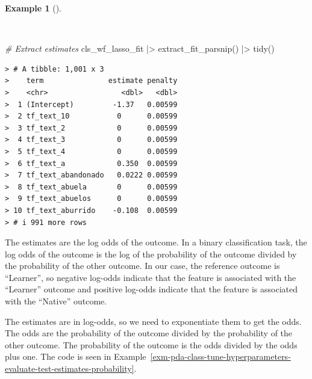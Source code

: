 \documentclass[
  letterpaper,
  DIV=11,
  numbers=noendperiod]{scrreprt}
\newenvironment{Shaded}{\begin{snugshade}}{\end{snugshade}}
\newcommand{\CommentTok}[1]{\textcolor[rgb]{0.00,0.00,0.00}{\textit{#1}}}
\newcommand{\FunctionTok}[1]{\textcolor[rgb]{0.00,0.00,0.00}{#1}}
\newcommand{\NormalTok}[1]{\textcolor[rgb]{0.00,0.00,0.00}{#1}}
\newcommand{\SpecialCharTok}[1]{\textcolor[rgb]{0.00,0.00,0.00}{#1}}
\theoremstyle{definition}
\newtheorem{example}{Example}[chapter]
\theoremstyle{remark}
\begin{document}
\begin{example}[]\protect\hypertarget{exm-pda-class-tune-hyperparameters-evaluate-test-estimates}{}\label{exm-pda-class-tune-hyperparameters-evaluate-test-estimates}

~

\begin{Shaded}
\begin{Highlighting}[]
\CommentTok{\# Extract estimates}
\NormalTok{cls\_wf\_lasso\_fit }\SpecialCharTok{|\textgreater{}}
  \FunctionTok{extract\_fit\_parsnip}\NormalTok{() }\SpecialCharTok{|\textgreater{}}
  \FunctionTok{tidy}\NormalTok{()}
\end{Highlighting}
\end{Shaded}

\begin{verbatim}
> # A tibble: 1,001 x 3
>    term               estimate penalty
>    <chr>                 <dbl>   <dbl>
>  1 (Intercept)         -1.37   0.00599
>  2 tf_text_10           0      0.00599
>  3 tf_text_2            0      0.00599
>  4 tf_text_3            0      0.00599
>  5 tf_text_4            0      0.00599
>  6 tf_text_a            0.350  0.00599
>  7 tf_text_abandonado   0.0222 0.00599
>  8 tf_text_abuela       0      0.00599
>  9 tf_text_abuelos      0      0.00599
> 10 tf_text_aburrido    -0.108  0.00599
> # i 991 more rows
\end{verbatim}

\end{example}

The estimates are the log odds of the outcome. In a binary
classification task, the log odds of the outcome is the log of the
probability of the outcome divided by the probability of the other
outcome. In our case, the reference outcome is ``Learner'', so negative
log-odds indicate that the feature is associated with the ``Learner''
outcome and positive log-odds indicate that the feature is associated
with the ``Native'' outcome.

The estimates are in log-odds, so we need to exponentiate them to get
the odds. The odds are the probability of the outcome divided by the
probability of the other outcome. The probability of the outcome is the
odds divided by the odds plus one. The code is seen in
Example~\ref{exm-pda-class-tune-hyperparameters-evaluate-test-estimates-probability}.
\end{document}
